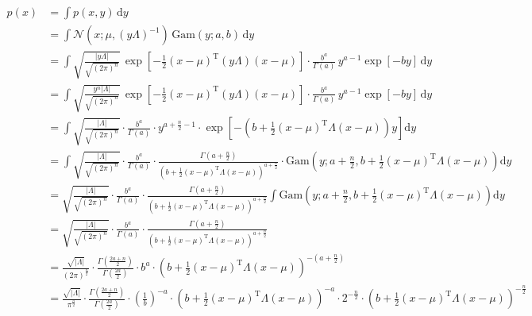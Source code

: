 \documentclass[a4paper,12pt,twoside]{book}
\begin{document}
\begin{equation} \label{eq:ng-marg-ng-marg-x-qed}
\begin{split}
p(x) &= \int p(x,y) \, \mathrm{d}y \\
&= \int \mathcal{N}(x; \mu, (y \Lambda)^{-1}) \, \mathrm{Gam}(y; a, b) \, \mathrm{d}y \\
&= \int \sqrt{\frac{|y \Lambda|}{\sqrt{(2 \pi)^n}}} \, \exp \left[ -\frac{1}{2} (x-\mu)^\mathrm{T} (y \Lambda) (x-\mu) \right] \cdot \frac{b^a}{\Gamma(a)} \, y^{a-1} \exp[-b y] \, \mathrm{d}y \\
&= \int \sqrt{\frac{y^n |\Lambda|}{\sqrt{(2 \pi)^n}}} \, \exp \left[ -\frac{1}{2} (x-\mu)^\mathrm{T} (y \Lambda) (x-\mu) \right] \cdot \frac{b^a}{\Gamma(a)} \, y^{a-1} \exp[-b y] \, \mathrm{d}y \\
&= \int \sqrt{\frac{|\Lambda|}{\sqrt{(2 \pi)^n}}} \cdot \frac{b^a}{\Gamma(a)} \cdot y^{a+\frac{n}{2}-1} \cdot \exp \left[ -\left( b + \frac{1}{2} (x-\mu)^\mathrm{T} \Lambda (x-\mu) \right) y \right] \mathrm{d}y \\
&= \int \sqrt{\frac{|\Lambda|}{\sqrt{(2 \pi)^n}}} \cdot \frac{b^a}{\Gamma(a)} \cdot \frac{\Gamma\left( a+\frac{n}{2} \right)}{\left( b + \frac{1}{2} (x-\mu)^\mathrm{T} \Lambda (x-\mu) \right)^{a+\frac{n}{2}}} \cdot \mathrm{Gam}\left( y; a+\frac{n}{2}, b + \frac{1}{2} (x-\mu)^\mathrm{T} \Lambda (x-\mu) \right) \mathrm{d}y \\
&= \sqrt{\frac{|\Lambda|}{\sqrt{(2 \pi)^n}}} \cdot \frac{b^a}{\Gamma(a)} \cdot \frac{\Gamma\left( a+\frac{n}{2} \right)}{\left( b + \frac{1}{2} (x-\mu)^\mathrm{T} \Lambda (x-\mu) \right)^{a+\frac{n}{2}}} \int \mathrm{Gam}\left( y; a+\frac{n}{2}, b + \frac{1}{2} (x-\mu)^\mathrm{T} \Lambda (x-\mu) \right) \mathrm{d}y \\
&= \sqrt{\frac{|\Lambda|}{\sqrt{(2 \pi)^n}}} \cdot \frac{b^a}{\Gamma(a)} \cdot \frac{\Gamma\left( a+\frac{n}{2} \right)}{\left( b + \frac{1}{2} (x-\mu)^\mathrm{T} \Lambda (x-\mu) \right)^{a+\frac{n}{2}}} \\
&= \frac{\sqrt{|\Lambda|}}{(2 \pi)^\frac{n}{2}} \cdot \frac{\Gamma\left( \frac{2a+n}{2} \right)}{\Gamma\left( \frac{2a}{2} \right)} \cdot b^a \cdot \left( b + \frac{1}{2} (x-\mu)^\mathrm{T} \Lambda (x-\mu) \right)^{-\left( a+\frac{n}{2} \right)} \\
&= \frac{\sqrt{|\Lambda|}}{\pi^\frac{n}{2}} \cdot \frac{\Gamma\left( \frac{2a+n}{2} \right)}{\Gamma\left( \frac{2a}{2} \right)} \cdot \left( \frac{1}{b} \right)^{-a} \cdot \left( b + \frac{1}{2} (x-\mu)^\mathrm{T} \Lambda (x-\mu) \right)^{-a} \cdot 2^{-\frac{n}{2}} \cdot \left( b + \frac{1}{2} (x-\mu)^\mathrm{T} \Lambda (x-\mu) \right)^{-\frac{n}{2}} \\

\end{split}
\end{equation}
\end{document}
